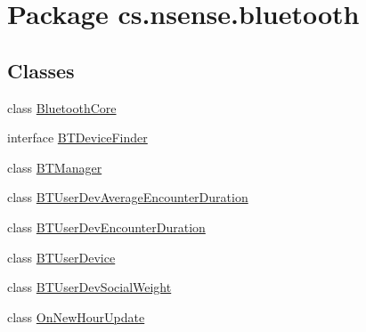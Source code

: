 \hypertarget{namespacecs_1_1nsense_1_1bluetooth}{\section{Package cs.\-nsense.\-bluetooth}
\label{namespacecs_1_1nsense_1_1bluetooth}
}
\subsection*{Classes}
\begin{DoxyCompactItemize}
\item 
class \hyperlink{classcs_1_1nsense_1_1bluetooth_1_1_bluetooth_core}{Bluetooth\-Core}
\item 
interface \hyperlink{interfacecs_1_1nsense_1_1bluetooth_1_1_b_t_device_finder}{B\-T\-Device\-Finder}
\item 
class \hyperlink{classcs_1_1nsense_1_1bluetooth_1_1_b_t_manager}{B\-T\-Manager}
\item 
class \hyperlink{classcs_1_1nsense_1_1bluetooth_1_1_b_t_user_dev_average_encounter_duration}{B\-T\-User\-Dev\-Average\-Encounter\-Duration}
\item 
class \hyperlink{classcs_1_1nsense_1_1bluetooth_1_1_b_t_user_dev_encounter_duration}{B\-T\-User\-Dev\-Encounter\-Duration}
\item 
class \hyperlink{classcs_1_1nsense_1_1bluetooth_1_1_b_t_user_device}{B\-T\-User\-Device}
\item 
class \hyperlink{classcs_1_1nsense_1_1bluetooth_1_1_b_t_user_dev_social_weight}{B\-T\-User\-Dev\-Social\-Weight}
\item 
class \hyperlink{classcs_1_1nsense_1_1bluetooth_1_1_on_new_hour_update}{On\-New\-Hour\-Update}
\end{DoxyCompactItemize}


